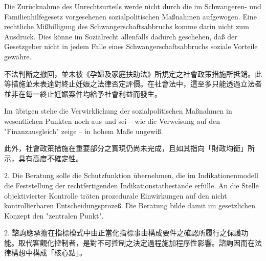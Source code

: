 \documentclass[12pt]{article}
\begin{document}
\begin{sourcepara}[title={原文C.5}]
Die Zurücknahme des Unrechtsurteils werde nicht durch die im Schwangeren- und Familienhilfegesetz vorgesehenen sozialpolitischen Maßnahmen aufgewogen. Eine rechtliche Mißbilligung des Schwangerschaftsabbruchs komme darin nicht zum Ausdruck. Dies könne im Sozialrecht allenfalls dadurch geschehen, daß der Gesetzgeber nicht in jedem Falle eines Schwangerschaftsabbruchs soziale Vorteile gewähre.
\end{sourcepara}
\begin{transpara}
不法判斷之撤回，並未被《孕婦及家庭扶助法》所規定之社會政策措施所抵銷。此等措施並未表達對終止妊娠之法律否定評價。在社會法中，這至多只能透過立法者並非在每一終止妊娠案件均給予社會利益而發生。
\end{transpara}

\begin{sourcepara}[title={原文C.6}]
Im übrigen stehe die Verwirklichung der sozialpolitischen Maßnahmen in wesentlichen Punkten noch aus und sei -- wie die Verweisung auf den "Finanzausgleich" zeige -- in hohem Maße ungewiß.
\end{sourcepara}
\begin{transpara}
此外，社會政策措施在重要部分之實現仍尚未完成，且如其指向「財政均衡」所示，具有高度不確定性。
\end{transpara}

\begin{sourcepara}[title={原文C.7}]
2. Die Beratung solle die Schutzfunktion übernehmen, die im Indikationenmodell die Feststellung der rechtfertigenden Indikationstatbestände erfülle. An die Stelle objektivierter Kontrolle träten prozedurale Einwirkungen auf den nicht kontrollierbaren Entscheidungsprozeß. Die Beratung bilde damit im gesetzlichen Konzept den "zentralen Punkt".
\end{sourcepara}
\begin{transpara}
2. 諮詢應承擔在指標模式中由正當化指標事由構成要件之確認所履行之保護功能。取代客觀化控制者，是對不可控制之決定過程施加程序性影響。諮詢因而在法律構想中構成「核心點」。
\end{transpara}
\end{document}
